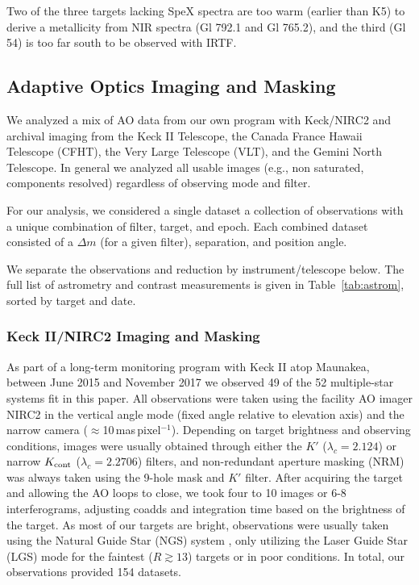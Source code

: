 \documentclass[twocolumn]{aastex62}
\begin{document}
Two of the three targets lacking SpeX spectra are too warm (earlier than K5) to derive a metallicity from NIR spectra (Gl 792.1 and Gl 765.2), and the third (Gl 54) is too far south to be observed with IRTF. 

\subsection{Adaptive Optics Imaging and Masking}\label{sec:ao}

We analyzed a mix of AO data from our own program with Keck/NIRC2 and archival imaging from the Keck II Telescope, the Canada France Hawaii Telescope (CFHT), the Very Large Telescope (VLT), and the Gemini North Telescope. In general we analyzed all usable images (e.g., non saturated, components resolved) regardless of observing mode and filter. 

For our analysis, we considered a single dataset a collection of observations with a unique combination of filter, target, and epoch. Each combined dataset consisted of a $\Delta m$ (for a given filter), separation, and position angle. 

We separate the observations and reduction by instrument/telescope below. The full list of astrometry and contrast measurements is given in Table~\ref{tab:astrom}, sorted by target and date. 

\subsubsection{Keck II/NIRC2 Imaging and Masking}

As part of a long-term monitoring program with Keck II atop Maunakea, between June 2015 and November 2017 we observed 49 of the 52 multiple-star systems fit in this paper. All observations were taken using the facility AO imager NIRC2 in the vertical angle mode (fixed angle relative to elevation axis) and the narrow camera ($\approx$10\,mas\,pixel$^{-1}$). Depending on target brightness and observing conditions, images were usually obtained through either the $K'$ ($\lambda_c=2.124$\um) or narrow $K_{\rm{cont}}$ ($\lambda_c=2.2706$\um) filters, and non-redundant aperture masking (NRM) was always taken using the 9-hole mask and $K'$ filter. After acquiring the target and allowing the AO loops to close, we took four to 10 images or 6-8 interferograms, adjusting coadds and integration time based on the brightness of the target. As most of our targets are bright, observations were usually taken using the Natural Guide Star (NGS) system \citep{2000PASP..112..315W,2004ApOpt..43.5458V}, only utilizing the Laser Guide Star (LGS) mode for the faintest ($R\gtrsim13$) targets or in poor conditions. In total, our observations provided 154 datasets.
\end{document}
